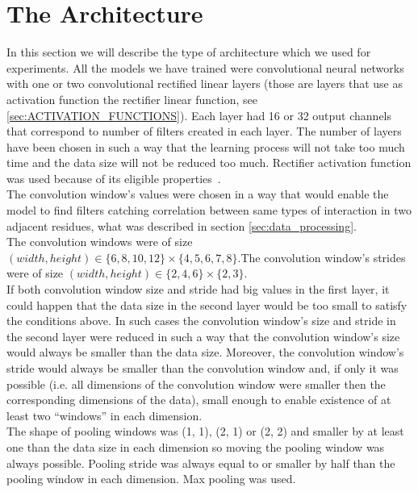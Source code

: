 \documentclass[a4paper,10pt]{report}
\begin{document}
      \section{The Architecture}
      In this section we will describe the type of architecture which we used for experiments. All the models we have trained were convolutional neural networks with one or two convolutional rectified linear layers (those are layers that use as activation function the rectifier linear function, see \ref{sec:ACTIVATION_FUNCTIONS}). Each layer had 16 or 32 output channels that correspond to number of filters created in each layer. The number of layers have been chosen in such a way that the learning process will not take too much time and the data size will not be reduced too much. Rectifier activation function was used because of its eligible properties~\cite{DUTCH}.\\ 
   
      The convolution window's values were chosen in a way that would enable the model to find filters catching correlation between same types of interaction in two adjacent residues, what was described in section \ref{sec:data_processing}.\\
      
      The convolution windows were of size $(width, height) \in \{6, 8, 10, 12\} \times \{4, 5, 6, 7, 8\}$.The convolution window's strides were of size $(width, height) \in \{2, 4, 6\} \times \{2, 3\}$.\\
      
      If both convolution window size and stride had big values in the first layer, it could happen that the data size in the second layer would be too small to satisfy the conditions above. In such cases the convolution window's size and stride in the second layer were reduced in such a way that the convolution window's size would always be smaller than the data size. Moreover, the convolution window's stride would always be smaller than the convolution window and, if only it was possible (i.e. all dimensions of the convolution window were smaller then the corresponding dimensions of the data), small enough to enable existence of at least two ``windows'' in each dimension.\\
      
      The shape of pooling windows was (1, 1), (2, 1) or (2, 2) and smaller by at least one than the data size in each dimension so moving the pooling window was always possible. Pooling stride was always equal to or smaller by half than the pooling window in each dimension. Max pooling was used.\\
      
\end{document}
